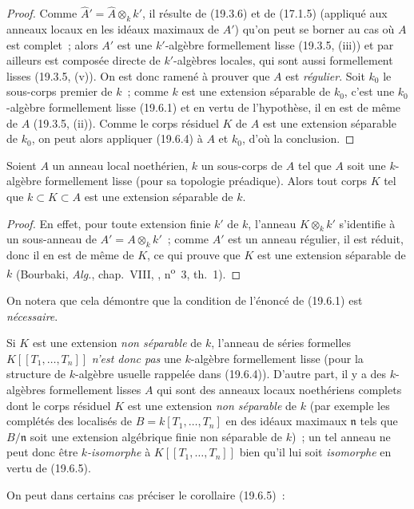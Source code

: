 \begin{proof}
Comme $\widehat A'=\widehat A\otimes_k k'$, il résulte de (19.3.6) et de
(17.1.5) (appliqué aux anneaux locaux en les idéaux maximaux de $A'$) qu'on
peut se borner au cas où $A$ est complet~; alors $A'$ est une $k'$-algèbre
formellement lisse (19.3.5, (iii)) et par ailleurs est composée directe de
$k'$-algèbres locales, qui sont aussi formellement lisses (19.3.5, (v)). On est
donc ramené à prouver que $A$ est \emph{régulier}. Soit $k_0$ le sous-corps
premier de $k$~; comme $k$ est une extension séparable de $k_0$, c'est une
$k_0$-algèbre formellement lisse (19.6.1) et en vertu de l'hypothèse, il en est
de même de $A$ (19.3.5, (ii)). Comme le corps résiduel $K$ de $A$ est une
extension séparable de $k_0$, on peut alors appliquer (19.6.4) à $A$ et $k_0$,
d'où la conclusion.
\end{proof}


\begin{corollary}[19.6.5.1]
\label{0.19.6.5.1-fr}
Soient $A$ un anneau local noethérien, $k$ un sous-corps de $A$ tel que $A$
soit une $k$-algèbre formellement lisse (pour sa topologie préadique). Alors
tout corps $K$ tel que $k\subset K\subset A$ est une extension séparable de
$k$.
\end{corollary}

\begin{proof}
En effet, pour toute extension finie $k'$ de $k$, l'anneau $K\otimes_k k'$ 
s'identifie à un sous-anneau de $A'=A\otimes_k k'$~; comme $A'$ est un anneau
régulier, il est réduit, donc il en est de même de $K$, ce qui prouve que $K$
est une extension séparable de $k$ (Bourbaki, \emph{Alg.}, chap.~VIII,
, n\textsuperscript{o}~3, th.~1).
\end{proof}

On notera que cela démontre que la condition de l'énoncé de (19.6.1) est
\emph{nécessaire}.

\begin{remark}[19.6.5.2]
\label{0.19.6.5.2-fr}
Si $K$ est une extension \emph{non séparable} de $k$, l'anneau de séries
formelles $K[[T_1,\ldots,T_n]]$ \emph{n'est donc pas} une $k$-algèbre
formellement lisse (pour la structure de $k$-algèbre usuelle rappelée dans
(19.6.4)). D'autre part, il y a des $k$-algèbres formellement lisses $A$ qui
sont des anneaux locaux noethériens complets dont le corps résiduel $K$ est une
extension \emph{non séparable} de $k$ (par exemple les complétés des localisés
de $B=k[T_1,\ldots,T_n]$ en des idéaux maximaux $\mathfrak n$ tels que
$B/\mathfrak n$ soit une extension algébrique finie non séparable de $k$)~; un
tel anneau ne peut donc être \emph{$k$-isomorphe} à $K[[T_1,\ldots,T_n]]$ bien qu'il
lui soit \emph{isomorphe} en vertu de (19.6.5).

On peut dans certains cas préciser le corollaire (19.6.5)~:
\end{remark}


